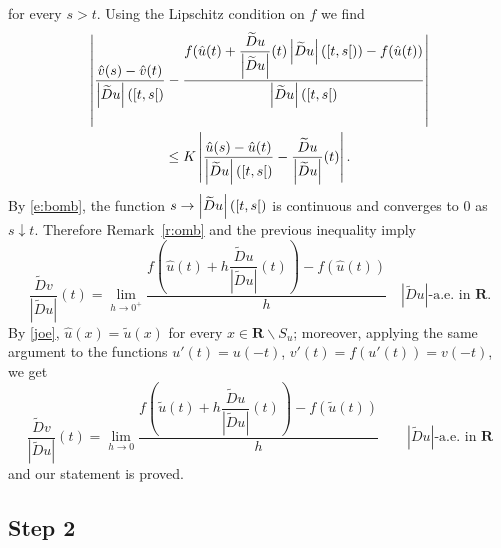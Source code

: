 \documentclass{article}
\theoremstyle{definition}
\theoremstyle{remark}
\newcommand{\wt}{\widetilde}
\newcommand{\interval}[1]{\mathinner{#1}}
\newcommand{\envert}[1]{\left\lvert#1\right\rvert}
\let\abs=\envert
\begin{document}
for every $s>t$. Using the Lipschitz condition on $f$ we find
{\setlength{\multlinegap}{0pt}
\begin{multline*}
\left\lvert\frac{\hat v(s)-\hat
v(t)}{\abs{\wt{D}u}(\interval{\left[t,s\right[})} -\frac{f(\hat
u(t)+\dfrac{\wt{D}u}{\abs{\wt{D}u}}(t)
\abs{\wt{D}u}(\interval{\left[t,s\right[}))-f(\hat
u(t))}{\abs{\wt{D}u}(\interval{\left[t,s\right[})}\right\rvert\\
\le K\left\lvert
\frac{\hat u(s)-\hat u(t)}
  {\abs{\wt{D}u}(\interval{\left[t,s\right[})}
-\frac{\wt{D}u}{\abs{
\wt{D}u}}(t)\right\rvert.\end{multline*}
}%
By \eqref{e:bomb}, the function $s\to
\abs{\wt{D}u}(\interval{\left[t,s\right[})$ is continuous and
converges to 0 as $s\downarrow t$. Therefore Remark~\ref{r:omb} and the
previous inequality imply
\[\frac{\wt{D}v}{\abs{\wt{D}u}}(t)=\lim_{h\to 0^+}
\frac{f(\hat u(t)+h\dfrac{\wt{D}u}{\abs{\wt{D}u}}
(t))-f(\hat u(t))}h\quad\abs{\wt{D}u}\text{-a.e. in }\mathbf{R}.\]
By \eqref{joe}, $\hat u(x)=\tilde u(x)$ for every
$x\in\mathbf{R}\backslash S_u$; moreover, applying the same argument to
the functions $u'(t)=u(-t)$, $v'(t)=f(u'(t))=v(-t)$, we get
\[\frac{\wt{D}v}{\abs{\wt{D}u}}(t)=\lim_{h\to 0}
\frac{f(\tilde u(t)
+h\dfrac{\wt{D}u}{\abs{\wt{D}u}}(t))-f(\tilde u(t))}{h}
\qquad\abs{\wt{D}u}\text{-a.e. in }\mathbf{R}\]
and our statement is proved.

\subsection*{Step 2}
\end{document}
